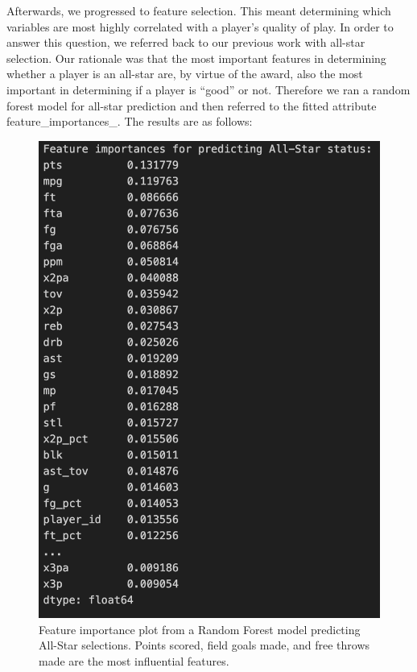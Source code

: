 \documentclass[12pt]{article}
\begin{document}
Afterwards, we progressed to feature selection. This meant determining which variables are most highly correlated with a player’s quality of play. In order to answer this question, we referred back to our previous work with all-star selection. Our rationale was that the most important features in determining whether a player is an all-star are, by virtue of the award, also the most important in determining if a player is “good” or not. Therefore we ran a random forest model for all-star prediction and then referred to the fitted attribute feature\_importances\_. The results are as follows: 

\begin{figure}[H]
    \centering
    \includegraphics[scale = 0.5]{EDA_FEATURE_SELECTION.png}
    \caption{Feature importance plot from a Random Forest model predicting All-Star selections. Points scored, field goals made, and free throws made are the most influential features.}
    \label{fig:feature_importance_allstar}
\end{figure}
\end{document}
